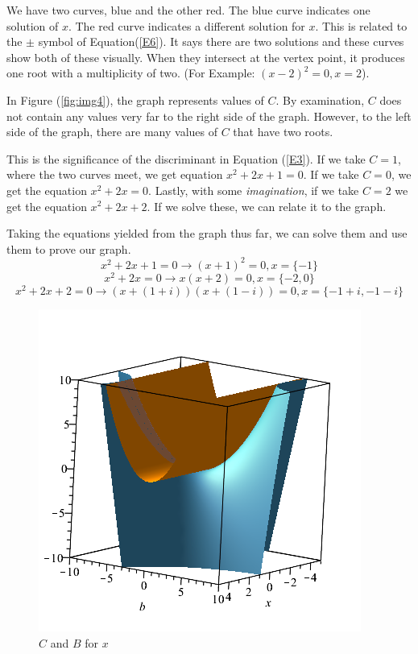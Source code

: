 \documentclass[14pt]{extarticle}
\begin{document}
We have two curves, blue and the other red. The blue curve indicates one solution of $x$. The red curve indicates a different solution for $x$. This is related to the $\pm$ symbol of Equation(\ref{E6}). It says there are two solutions and these curves show both of these visually. When they intersect at the vertex point, it produces one root with a multiplicity of two. (For Example: $(x-2)^2=0, x={2}$).

In Figure (\ref{fig:img4}), the graph represents values of $C$. By examination, $C$ does not contain any values very far to the right side of the graph. However, to the left side of the graph, there are many values of $C$ that have two roots.

This is the significance of the discriminant in Equation (\ref{E3}). If we take $C=1$, where the two curves meet, we get equation $x^2+2x+1=0$. If we take $C=0$, we get the equation $x^2+2x=0$. Lastly, with some \textit{imagination}, if we take $C=2$ we get the equation $x^2+2x+2$. If we solve these, we can relate it to the graph.

\indent Taking the equations yielded from the graph thus far, we can solve them and use them to prove our graph.
$$x^2+2x+1=0 \to (x+1)^2=0, x=\{-1\}$$
$$x^2+2x=0 \to x(x+2)=0, x=\{-2,0\}$$
$$x^2+2x+2=0 \to (x+(1+i))(x+(1-i))=0, x=\{-1+i,-1-i\}$$
\begin{figure}
	\begin{center}
		\includegraphics[scale=0.55]{graph8.png}
		\caption{$C$ and $B$ for $x$}
		\label{fig:img5}
	\end{center}
\end{figure}
\end{document}
